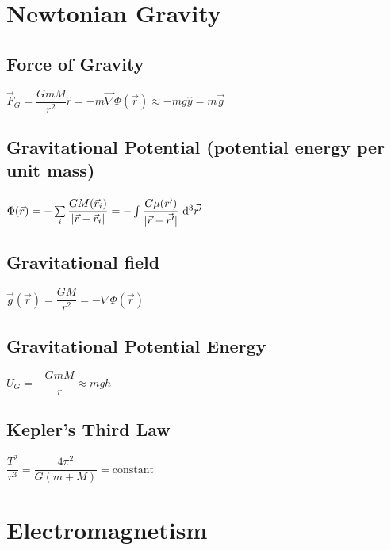	\section{Newtonian Gravity}	

\subsection{Force of Gravity}
\begin{itemize}
\itemt \( \vec{F}_G = \dfrac{GmM}{r^2} \hat{r} = -m\vec{\nabla}\Phi(\vec{r}) \approx -mg\hat{y} = m\vec{g}\)
\end{itemize}	

\subsection{Gravitational Potential (potential energy per unit mass)}		
\begin{itemize}
\itemt \( \Phi(\vec{r}) = -\sum\limits_{i} \dfrac{GM(\vec{r}_i)}{|\vec{r}-\vec{r}_i|} = - \int \dfrac{G\mu(\vec{r'})}{|\vec{r} - \vec{r'}|} \ \mathrm{d}^3\vec{r'} \)
\end{itemize}

\subsection{Gravitational field}
\begin{itemize}
\itemt \(\vec{g}(\vec{r}) = \dfrac{GM}{r^2} = -\nabla\Phi(\vec{r})\)
\end{itemize}										

\subsection{Gravitational Potential Energy}		
\begin{itemize}
\itemt \( U_G = -\dfrac{GmM}{r} \approx mgh\)
\end{itemize}

\subsection{Kepler's Third Law}		
\begin{itemize}
\itemt \( \dfrac{T^2}{r^3} = \dfrac{4\pi^2}{G(m+M)} = \mathrm{constant}\)
\end{itemize}	

	\section{Electromagnetism}

